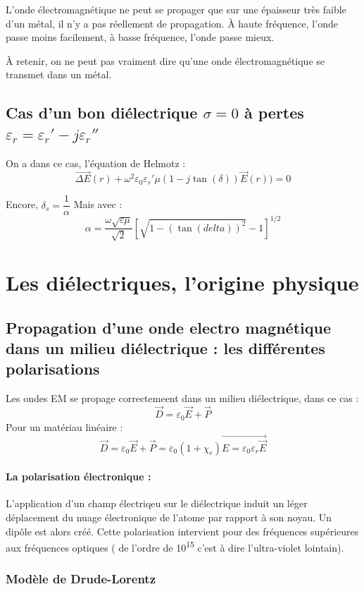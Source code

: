 \documentclass[12pt,a4paper]{report}
\begin{document}
L'onde électromagnétique ne peut se propager que sur une épaisseur très faible d'un métal, il n'y a pas réellement de propagation.
À haute fréquence, l'onde passe moins facilement, à basse fréquence, l'onde passe mieux.

À retenir, on ne peut pas vraiment dire qu'une onde électromagnétique se transmet dans un métal.

\subsection{Cas d'un bon diélectrique \(\sigma = 0\) à pertes \(\varepsilon_r = \varepsilon_r' - j\varepsilon_r''\)}

On a dans ce cas, l'équation de Helmotz :
\[
	\vec{\Delta E} (r) + \omega^2 \varepsilon_0 \varepsilon_r' \mu (1 - j\tan(\delta)) \vec{E}(r)) = 0
\]

Encore, \(\delta_s = \dfrac{1}{\alpha}\)
Mais avec :
\[
	\alpha = \dfrac{\omega \sqrt{\varepsilon \mu}}{\sqrt{2}} \left[ \sqrt{1 - (\tan (delta))^2} - 1 \right]^{1/2}
\]

\section{Les diélectriques, l'origine physique}

\subsection{Propagation d'une onde electro magnétique dans un milieu diélectrique : les différentes polarisations}

Les ondes EM se propage correctemeent dans un milieu diélectrique, dans ce cas :
\[
	\vec{D} = \varepsilon_0 \vec{E} + \vec{P}
\]
Pour un matériau linéaire :
\[
	\vec{D} = \varepsilon_0 \vec{E} + \vec{P} = \varepsilon_0 (1 + \chi_e) \vec{E = \varepsilon_0 \varepsilon_r \vec{E}}
\]

\paragraph{La polarisation électronique :} L'application d'un champ électriqeu sur le diélectrique induit un léger déplacement du nuage électronique de l'atome par rapport à son noyau. Un dipôle est alors créé. Cette polarisation intervient pour des fréquences supérieures aux fréquences optiques ( de l'ordre de \unit{10^{15}}{\hertz} c'est à dire l'ultra-violet lointain).

\subsubsection{Modèle de Drude-Lorentz}
\end{document}
